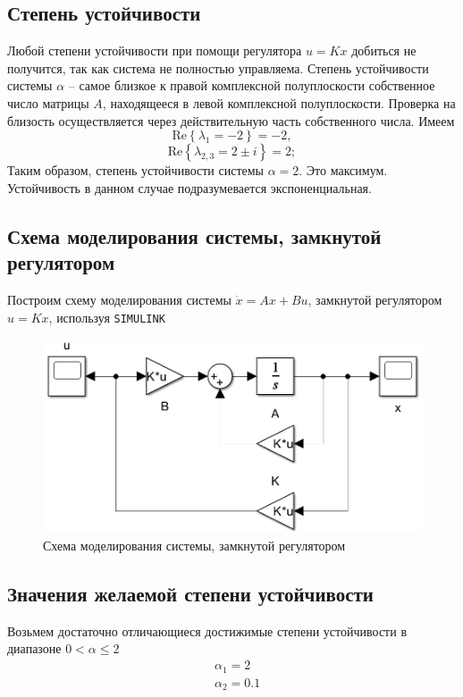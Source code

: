 \documentclass[a4paper, 12pt]{article}
\begin{document}
    \subsection{Степень устойчивости}
    Любой степени устойчивости при помощи регулятора $u=Kx$ добиться не получится, так как система не полностью управляема.
    Степень устойчивости системы $\alpha$ -- самое близкое
    к правой комплексной полуплоскости собственное число матрицы $A$,
    находящееся в левой комплексной полуплоскости. Проверка на близость
    осуществляется через действительную часть собственного числа. Имеем
    $$
    \text{Re}\left\{ \lambda_1=-2 \right\}=-2,
    $$
    $$\text{Re}\left\{ \lambda_{2,3}=2\pm i \right\}=2;
    $$
    Таким образом, степень устойчивости системы $\alpha=2$. Это максимум. Устойчивость в данном случае
    подразумевается экспоненциальная.


    \subsection{Схема моделирования системы, замкнутой регулятором}
    Построим схему моделирования системы $\dot{x}=Ax+Bu$, замкнутой регулятором $u=Kx$, используя \texttt{SIMULINK}
    \begin{figure}[H]
        \centering
        \includegraphics[scale=0.5]{scheme_task1.png}
        \captionsetup{skip=0pt}
        \caption{Схема моделирования системы, замкнутой регулятором}
        \label{fig:scheme_task1}
    \end{figure}


    \subsection{Значения желаемой степени устойчивости}
    Возьмем достаточно отличающиеся достижимые степени устойчивости в диапазоне $0<\alpha\leq2$
    \begin{align*}
        &\alpha_{1}=2\\
        &\alpha_2=0.1
    \end{align*}
\end{document}
